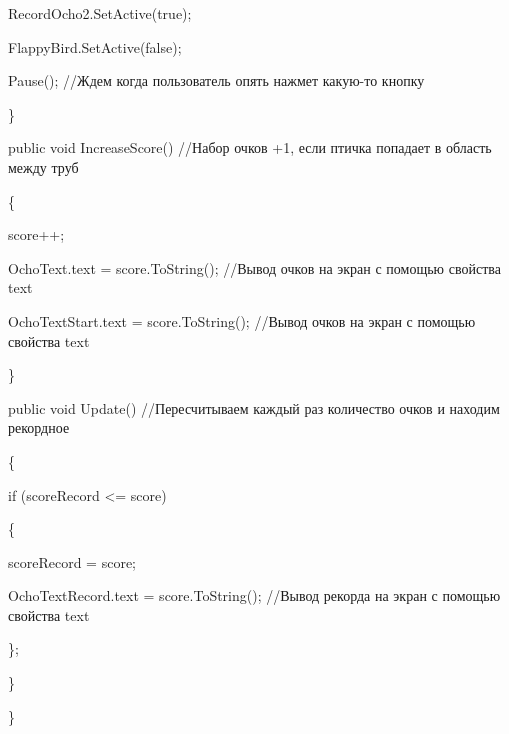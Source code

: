 \documentclass[14pt, oneside]{altsu-report}
\begin{document}
        RecordOcho2.SetActive(true);
        
        FlappyBird.SetActive(false);

        Pause(); //Ждем когда пользователь опять нажмет какую-то кнопку
        
    \}

    public void IncreaseScore() //Набор очков +1, если птичка попадает в область между труб
    
    \{
    
        score++;
        
        OchoText.text = score.ToString(); //Вывод очков на экран с помощью свойства text
        
        OchoTextStart.text = score.ToString(); //Вывод очков на экран с помощью свойства text
        
    \}


    public void Update() //Пересчитываем каждый раз количество очков и находим рекордное
    
    \{

        if (scoreRecord <= score)
        
        \{
        
            scoreRecord = score;
            
            OchoTextRecord.text = score.ToString(); //Вывод рекорда на экран с помощью свойства text

        \};
        
    \}

\}
\end{document}
